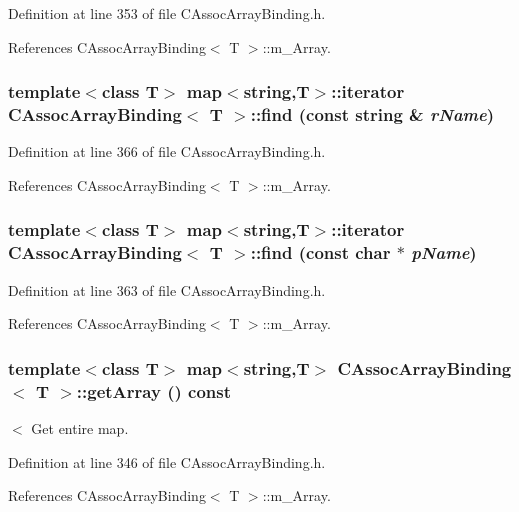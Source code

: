 Definition at line 353 of file CAssoc\-Array\-Binding.h.

References CAssoc\-Array\-Binding$<$ T $>$::m\_\-Array.
\subsubsection{\setlength{\rightskip}{0pt plus 5cm}template$<$class T$>$ map$<$string,T$>$::iterator CAssoc\-Array\-Binding$<$ T $>$::find (const string \& {\em r\-Name})\hspace{0.3cm}{\tt  [inline]}}\label{classCAssocArrayBinding_a9}




Definition at line 366 of file CAssoc\-Array\-Binding.h.

References CAssoc\-Array\-Binding$<$ T $>$::m\_\-Array.
\subsubsection{\setlength{\rightskip}{0pt plus 5cm}template$<$class T$>$ map$<$string,T$>$::iterator CAssoc\-Array\-Binding$<$ T $>$::find (const char $\ast$ {\em p\-Name})\hspace{0.3cm}{\tt  [inline]}}\label{classCAssocArrayBinding_a8}




Definition at line 363 of file CAssoc\-Array\-Binding.h.

References CAssoc\-Array\-Binding$<$ T $>$::m\_\-Array.
\subsubsection{\setlength{\rightskip}{0pt plus 5cm}template$<$class T$>$ map$<$string,T$>$ CAssoc\-Array\-Binding$<$ T $>$::get\-Array () const\hspace{0.3cm}{\tt  [inline]}}\label{classCAssocArrayBinding_a3}


$<$ Get entire map.



Definition at line 346 of file CAssoc\-Array\-Binding.h.

References CAssoc\-Array\-Binding$<$ T $>$::m\_\-Array.
